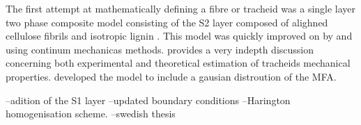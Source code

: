  The first attempt at mathematically defining a fibre or tracheid was a single layer two phase composite model consisting of the S2 layer composed of alighned cellulose fibrils and isotropic lignin \cite{Barber_1964}. This model was quickly improved on by \cite{mark1967cell} and \cite{Cave_1968} using continum mechanicas methods. \cite{mark1967cell} provides a very indepth discussion concerning both experimental and theoretical estimation of tracheids mechanical properties. \cite{Cave_1968} developed the model to include a gausian distroution of the MFA. 
 
 
 --adition of the S1 layer
 --updated boundary conditions
 --Harington homogenisation scheme. 
 --swedish thesis
 
